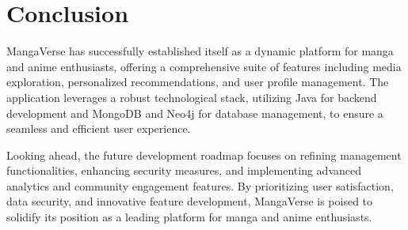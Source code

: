 \section{Conclusion}

MangaVerse has successfully established itself as a dynamic platform for manga and anime enthusiasts, offering
a comprehensive suite of features including media exploration, personalized recommendations, and user profile
management. The application leverages a robust technological stack, utilizing Java for backend development and
MongoDB and Neo4j for database management, to ensure a seamless and efficient user experience.

\vspace{\baselineskip}

Looking ahead, the future development roadmap focuses on refining management functionalities, enhancing security
measures, and implementing advanced analytics and community engagement features. By prioritizing user satisfaction,
data security, and innovative feature development, MangaVerse is poised to solidify its position as a leading
platform for manga and anime enthusiasts.